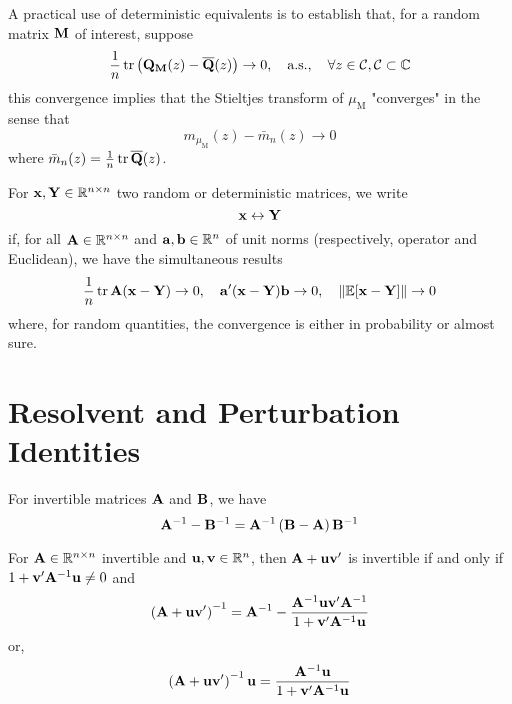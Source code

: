 \begin{remark}
	A practical use of deterministic equivalents is to establish that, for a random matrix ${\bf M}$ of interest, suppose
	\begin{equation*}
		\frac{1}{n}\operatorname{tr}\left({\bf Q}_{{\bf M}}(z)-\overline{{\bf Q}}(z)\right)\rightarrow 0,\quad\text{a.s.},\quad\forall z\in\mathcal{C} ,\mathcal{C}\subset\mathbb{C}
	\end{equation*}
	this convergence implies that the Stieltjes transform of $\mu_{\mathrm{M}}$ "converges" in the sense that
	\begin{equation*}
		m_{\mu_{\mathrm{M}}}(z)-\bar{m}_{n}(z)\rightarrow 0
	\end{equation*}
	where $\bar{m}_{n}(z)=\frac{1}{n}\operatorname{tr}\overline{{\bf Q}}(z)$.
\end{remark}

\begin{definition}
	For ${\bf x},\mathbf{Y}\in{\mathbb R}^{n \times n}$ two random or deterministic matrices, we write
	\begin{equation}
		{\bf x}\leftrightarrow\mathbf{Y}
	\end{equation}
	if, for all ${\bf A}\in{\mathbb R}^{n\times n}$ and ${\bf a},{\bf b}\in{\mathbb R}^{n}$ of unit norms (respectively, operator and Euclidean), we have the simultaneous results
	\begin{equation*}
		\frac{1}{n}\operatorname{tr}{\bf A}({\bf x}-\mathbf{Y})\rightarrow 0,\quad {\bf a}^{\prime}({\bf x}-\mathbf{Y}){\bf b}\rightarrow 0,\quad\|{\mathbb E}[{\bf x}-\mathbf{Y}]\|\rightarrow 0
	\end{equation*}
	where, for random quantities, the convergence is either in probability or almost sure.
\end{definition}

\section{Resolvent and Perturbation Identities}

\begin{lemma} \label{lem:resolvent-identity}
	For invertible matrices ${\bf A}$ and ${\bf B}$, we have
	\begin{equation}
		{\bf A}^{-1}-{\bf B}^{-1}={\bf A}^{-1}\left({\bf B}-{\bf A}\right){\bf B}^{-1}
	\end{equation}
\end{lemma}

\begin{lemma} \label{lem:sherman-morrison}
	For ${\bf A}\in{\mathbb R}^{n\times n}$ invertible and ${\bf u},{\bf v}\in{\mathbb R}^{n}$, then ${\bf A}+{\bf u}{\bf v}^{\prime}$ is invertible if and only if $1+{\bf v}^{\prime}{\bf A}^{-1}{\bf u}\neq 0$ and
	\begin{equation}
		\left({\bf A}+{\bf u}{\bf v}^{\prime}\right)^{-1}={\bf A}^{-1}-\frac{{\bf A}^{-1}{\bf u}{\bf v}^{\prime}{\bf A}^{-1}}{1+{\bf v}^{\prime}{\bf A}^{-1}{\bf u}}
	\end{equation}
	or,
	\begin{equation}
		\left({\bf A}+{\bf u}{\bf v}^{\prime}\right)^{-1}{\bf u}=\frac{{\bf A}^{-1}{\bf u}}{1+{\bf v}^{\prime}{\bf A}^{-1}{\bf u}}
	\end{equation}
\end{lemma}

